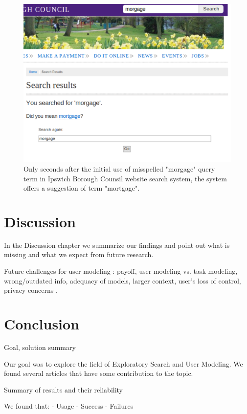 \documentclass{sigchi}
\begin{document}
\begin{figure}[htp] %
\caption{Only seconds after the initial use of misspelled "morgage" query term in Ipswich Borough Counsil website search system, the system offers a suggestion of term "mortgage".\protect} \label{figure_queryExpansion2b}
\includegraphics[scale=0.41]{figures/queryExpansion2b.pdf} 
\end{figure}

\section{Discussion}
In the Discussion chapter we summarize our findings and point out what is missing and what we expect from future research. 

Future challenges for user modeling : payoff, user modeling vs. task modeling, wrong/outdated info, adequacy of models, larger context, user's loss of control, privacy concerns \cite{fischer01}.

\section{Conclusion}
Goal, solution summary

Our goal was to explore the field of Exploratory Search and User Modeling. We found several articles that have some contribution to the topic.

Summary of results and their reliability 

We found that:
- Usage
- Success
- Failures
\end{document}
